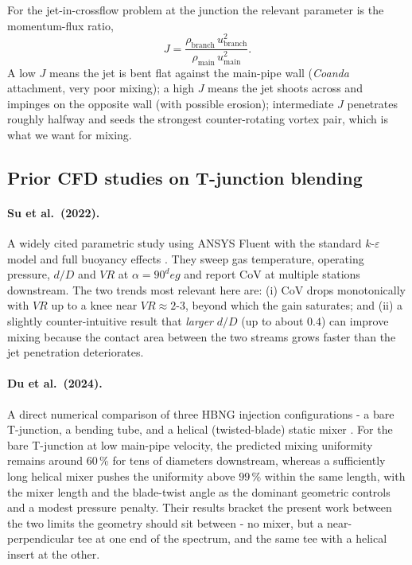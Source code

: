 \documentclass[11pt,a4paper]{article}
\def\dD{d/D}%
\def\VR{VR}%
\def\CoV{CoV}%
\def\circ{ deg}%
\newcommand{\dD}{\ensuremath{d/D}}
\newcommand{\VR}{\ensuremath{\mathrm{VR}}}
\newcommand{\CoV}{\ensuremath{\mathrm{CoV}}}
\begin{document}
For the jet-in-crossflow problem at the junction the relevant
parameter is the momentum-flux ratio,
\begin{equation}
J = \frac{\rho_{\mathrm{branch}}\,u_{\mathrm{branch}}^{2}}
{\rho_{\mathrm{main}}\,u_{\mathrm{main}}^{2}}.
\label{eq:J}
\end{equation}
A low \(J\) means the jet is bent flat
against the main-pipe wall (\emph{Coanda} attachment, very poor
mixing); a high \(J\) means the jet shoots across and impinges on
the opposite wall (with possible erosion); intermediate \(J\)
penetrates roughly halfway and seeds the strongest counter-rotating
vortex pair, which is what we want for mixing.

\subsection{Prior CFD studies on T-junction blending}

\paragraph{Su et al.\ (2022).}
A widely cited parametric study using ANSYS Fluent with the standard
\(k\)-\(\varepsilon\) model and full buoyancy effects
\citep{su2022prediction}. They sweep gas temperature, operating
pressure, \(\dD\) and \(\VR\) at \(\alpha=90^\circ\) and report
\CoV{} at multiple stations downstream. The two trends most relevant
here are: (i) \CoV{} drops monotonically with \(\VR\) up to a knee
near \(\VR\approx 2\)-\(3\), beyond which the gain saturates; and
(ii) a slightly counter-intuitive result that \emph{larger}
\(\dD\) (up to about \(0.4\)) can improve mixing because the contact
area between the two streams grows faster than the jet penetration
deteriorates.

\paragraph{Du et al.\ (2024).}
A direct numerical comparison of three HBNG injection
configurations - a bare T-junction, a bending tube, and a
helical (twisted-blade) static mixer \citep{du2024numerical}.
For the bare T-junction at low main-pipe velocity, the predicted
mixing uniformity remains around 60\,\% for tens of diameters
downstream, whereas a sufficiently long helical mixer pushes the
uniformity above \(99\,\%\) within the same length, with the
mixer length and the blade-twist angle as the dominant geometric
controls and a modest pressure penalty. Their results bracket the
present work between the two limits the geometry should sit
between - no mixer, but a near-perpendicular tee at one end of
the spectrum, and the same tee with a helical insert at the
other.
\end{document}
